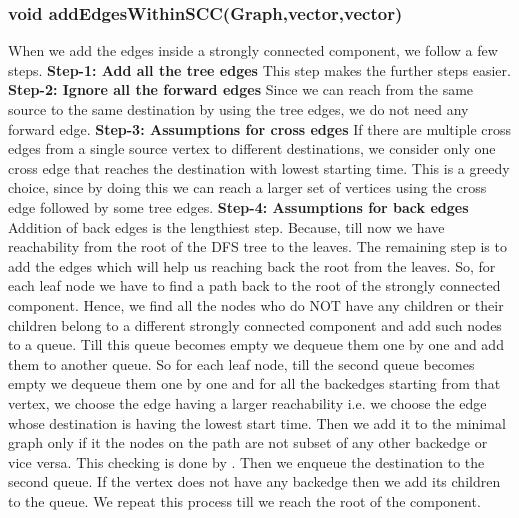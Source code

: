 \documentclass{article}
\begin{document}
\subsubsection{void addEdgesWithinSCC(Graph,vector,vector)}
When we add the edges inside a strongly connected component, we follow a few steps.\newline
\textbf{Step-1: Add all the tree edges}\newline
This step makes the further steps easier.\newline
\textbf{Step-2: Ignore all the forward edges}\newline
Since we can reach from the same source to the same destination by using the tree edges, we do not need any forward edge.\newline
\textbf{Step-3: Assumptions for cross edges}\newline
If there are multiple cross edges from a single source vertex to different destinations, we consider only one cross edge that reaches the destination with lowest starting time. This is a greedy choice, since by doing this we can reach a larger set of vertices using the cross edge followed by some tree edges.\newline
\textbf{Step-4: Assumptions for back edges}\newline
Addition of back edges is the lengthiest step. Because, till now we have reachability from the root of the DFS tree to the leaves. The remaining step is to add the edges which will help us reaching back the root from the leaves. So, for each leaf node we have to find a path back to the root of the strongly connected component. Hence, we find all the nodes who do NOT have any children or their children belong to a different strongly connected component and add such nodes to a queue. Till this queue becomes empty we dequeue them one by one and add them to another queue.\newline
So for each leaf node, till the second queue becomes empty we dequeue them one by one and for all the backedges starting from that vertex, we choose the edge having a larger reachability i.e. we choose the edge whose destination is having the lowest start time. Then we add it to the minimal graph only if it the nodes on the path are not subset of any other backedge or vice versa. This checking is done by . Then we enqueue the destination to the second queue. If the vertex does not have any backedge then we add its children to the queue. We repeat this process till we reach the root of the component.
\end{document}
